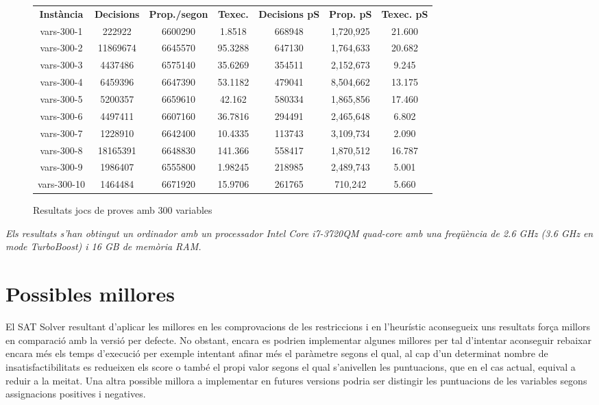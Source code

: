 \begin{figure}[H]
	\centering
	\begin{table}[H]
		\begin{tabular}{ccccccc}
			\rowcolor[HTML]{C0C0C0} 
			{\color[HTML]{000000} \textbf{Instància}} & {\color[HTML]{000000} \textbf{Decisions}} & {\color[HTML]{000000} \textbf{Prop./segon}} & {\color[HTML]{000000} \textbf{Texec.}} & {\color[HTML]{000000} \textbf{Decisions pS}}& {\color[HTML]{000000} \textbf{Prop. pS}}& {\color[HTML]{000000} \textbf{Texec. pS}} \\
			vars-300-1 & 222922 & 6600290 & 1.8518 & 668948 & 1,720,925 & 21.600\\
			vars-300-2 & 11869674 & 6645570 & 95.3288 & 647130 & 1,764,633 & 20.682\\
			vars-300-3 & 4437486 & 6575140 & 35.6269 & 354511 & 2,152,673 & 9.245\\
			vars-300-4 & 6459396 & 6647390 & 53.1182 & 479041 & 8,504,662 & 13.175\\
			vars-300-5 & 5200357 & 6659610 & 42.162 & 580334 & 1,865,856 & 17.460\\
			vars-300-6 & 4497411 & 6607160 & 36.7816 & 294491 & 2,465,648 & 6.802\\
			vars-300-7 & 1228910 & 6642400 & 10.4335 & 113743 & 3,109,734 & 2.090\\
			vars-300-8 & 18165391 & 6648830 & 141.366 & 558417 & 1,870,512 & 16.787\\
			vars-300-9 & 1986407 & 6555800 & 1.98245 & 218985 & 2,489,743 & 5.001\\
			vars-300-10 & 1464484 & 6671920 & 15.9706 & 261765 & 710,242 & 5.660\\                                                    
		\end{tabular}
	\end{table}
	\caption{Resultats jocs de proves amb 300 variables}
	\label{fig:my_label5}
\end{figure}
\begin{center}
\textit{Els resultats s'han obtingut un ordinador amb un processador Intel Core i7-3720QM quad-core amb una freqüència de 2.6 GHz (3.6 GHz en mode TurboBoost) i 16 GB de memòria RAM.  }
\end{center}

\section{Possibles millores}
El SAT Solver resultant d'aplicar les millores en les comprovacions de les restriccions i en l'heurístic aconsegueix uns resultats força millors en comparació amb la versió per defecte. No obstant, encara es podrien implementar algunes millores per tal d'intentar aconseguir rebaixar encara més els temps d'execució per exemple intentant afinar més el paràmetre segons el qual, al cap d'un determinat nombre de insatisfactibilitats es redueixen els score o també el propi valor segons el qual s'anivellen les puntuacions, que en el cas actual, equival a reduir a la meitat. Una altra possible millora a implementar en futures versions podria ser distingir les puntuacions de les variables segons assignacions positives i negatives. 

